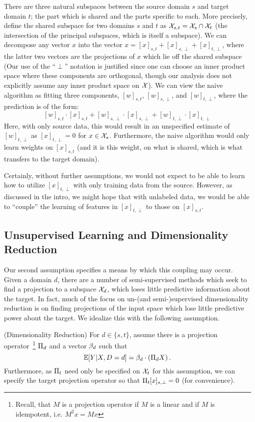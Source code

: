 There are three natural subspaces between the source domain $s$ and
target domain $t$; the part which is shared and the parts specific to
each. More precisely, define the shared subspace for two domains $s$
and $t$ as $\mathcal{X}_{s,t} = \mathcal{X}_s \cap \mathcal{X}_t$ (the intersection of the
principal subspaces, which is itself a subspace). We can decompose any
vector $x$ into the vector $x=[x]_{s,t}+ [x]_{s,\perp}+
[x]_{t,\perp}$, where the latter two vectors are the projections of
$x$ which lie off the shared subspace (Our use of the ``$\perp$''
notation is justified since one can choose an inner product space
where these components are orthogonal, though our analysis does not
explicitly assume any inner product space on $\mathcal{X}$).  We can view the
naive algorithm as fitting three components, $[w]_{s,t}$,
$[w]_{s,\perp}$, and $[w]_{t,\perp}$, where the prediction is of the
form:
\[
[w]_{s,t} \cdot [x]_{s,t}+[w]_{s,\perp} \cdot [x]_{s,\perp}+ [w]_{t,\perp}\cdot [x]_{t,\perp}
\]
Here, with only source data, this would result in an unspecified estimate of
$[w]_{t,\perp}$ as $[x]_{t,\perp}=0$ for $x \in \mathcal{X}_s$. Furthermore, the naive algorithm would only learn 
weights on $[x]_{s,t}$ (and it is this weight, on what is shared,
which is what transfers to the target domain).

Certainly, without further assumptions, we would not expect to be able
to learn how to utilize $[x]_{t,\perp}$ with only training data from
the source. However, as discussed in the intro, we might hope that
with unlabeled data, we would be able to ``couple''  the learning of
features in $[x]_{t,\perp}$ to those on $[x]_{s,t}$. 

\subsection{Unsupervised Learning and Dimensionality Reduction}

Our second assumption specifies a means by which this coupling may
occur. Given a domain $d$, there are a number of semi-supervised
methods which seek to find a projection to a subspace $\mathcal{X}_d$, which
loses little predictive information about the target. In fact, much of
the focus on un-(and semi-)supervised dimensionality reduction is on
finding projections of the input space which lose little predictive
power about the target. We idealize this with the following
assumption.

\begin{assumption} \label{ass:dim_red} (Dimensionality Reduction) For
  $d\in\{s,t\}$, assume there is a projection
  operator~\footnote{Recall, that $M$ is a projection operator if $M$
    is a linear and if $M$ is idempotent, i.e.  $M^2x=Mx$} $\Pi_d$
  and a vector $\beta_d$ such that
\[
{\mathbb E} [Y|X,D=d] = \beta_d \cdot (\Pi_d X) \, .
\]
Furthermore, as $\Pi_t$ need only be specified on $\mathcal{X}_t$ for this assumption, we can
specify the target projection operator so that $\Pi_t {[x]_{s,\perp}} = 0$ (for convenience).
\end{assumption}


